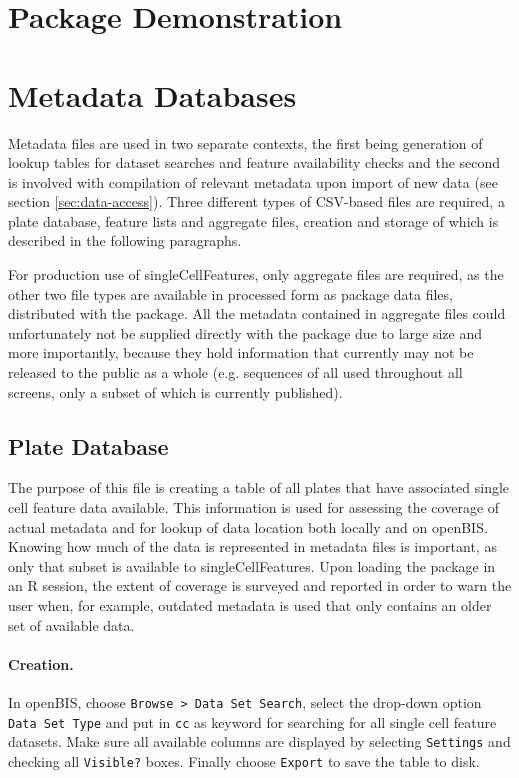 \section{Package Demonstration}


\section{Metadata Databases}
\label{sec:update-metadata}
Metadata files are used in two separate contexts, the first being generation of lookup tables for dataset searches and feature availability checks and the second is involved with compilation of relevant metadata upon import of new data (see section \ref{sec:data-access}). Three different types of CSV-based files are required, a plate database, feature lists and aggregate files, creation and storage of which is described in the following paragraphs.

For production use of singleCellFeatures, only aggregate files are required, as the other two file types are available in processed form as package data files, distributed with the package. All the metadata contained in aggregate files could unfortunately not be supplied directly with the package due to large size and more importantly, because they hold information that currently may not be released to the public as a whole (e.g. sequences of all  used throughout all screens, only a subset of which is currently published).

\subsection{Plate Database}
\label{sec:plate-database}
The purpose of this file is creating a table of all plates that have associated single cell feature data available. This information is used for assessing the coverage of actual metadata and for lookup of data location both locally and on openBIS. Knowing how much of the data is represented in metadata files is important, as only that subset is available to singleCellFeatures. Upon loading the package in an R session, the extent of coverage is surveyed and reported in order to warn the user when, for example, outdated metadata is used that only contains an older set of available data.

\paragraph{Creation.}
In openBIS, choose \texttt{Browse > Data Set Search}, select the drop-down option \texttt{Data Set Type} and put in \texttt{cc} as keyword for searching for all single cell feature datasets. Make sure all available columns are displayed by selecting \texttt{Settings} and checking all \texttt{Visible?} boxes. Finally choose \texttt{Export} to save the table to disk.

